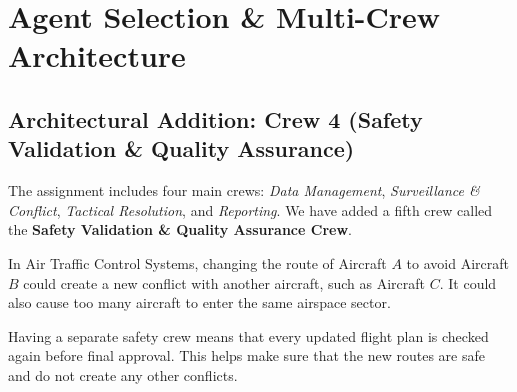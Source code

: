 \documentclass[12pt,a4paper]{article}
\begin{document}
\section{Agent Selection \& Multi-Crew Architecture}

\subsection{Architectural Addition: Crew 4 (Safety Validation \& Quality Assurance)}

The assignment includes four main crews: \textit{Data Management}, \textit{Surveillance \& Conflict}, \textit{Tactical Resolution}, and \textit{Reporting}. We have added a fifth crew called the \textbf{Safety Validation \& Quality Assurance Crew}.

\begin{successbox}
In Air Traffic Control Systems, changing the route of Aircraft $A$ to avoid Aircraft $B$ could create a new conflict with another aircraft, such as Aircraft $C$. It could also cause too many aircraft to enter the same airspace sector.

Having a separate safety crew means that every updated flight plan is checked again before final approval. This helps make sure that the new routes are safe and do not create any other conflicts.
\end{successbox}
\end{document}
